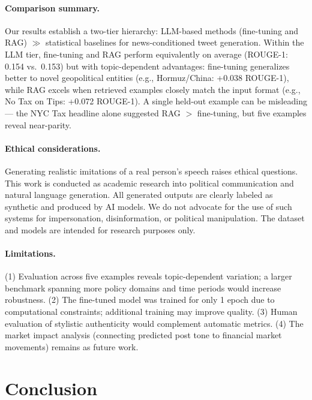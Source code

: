 \documentclass[11pt,a4paper]{article}
\begin{document}
\paragraph{Comparison summary.}
Our results establish a two-tier hierarchy: LLM-based methods (fine-tuning and RAG) $\gg$ statistical baselines for news-conditioned tweet generation. Within the LLM tier, fine-tuning and RAG perform equivalently on average (ROUGE-1: 0.154 vs.\ 0.153) but with topic-dependent advantages: fine-tuning generalizes better to novel geopolitical entities (e.g., Hormuz/China: +0.038 ROUGE-1), while RAG excels when retrieved examples closely match the input format (e.g., No Tax on Tips: +0.072 ROUGE-1). A single held-out example can be misleading — the NYC Tax headline alone suggested RAG $>$ fine-tuning, but five examples reveal near-parity.

\paragraph{Ethical considerations.}
Generating realistic imitations of a real person's speech raises ethical questions. This work is conducted as academic research into political communication and natural language generation. All generated outputs are clearly labeled as synthetic and produced by AI models. We do not advocate for the use of such systems for impersonation, disinformation, or political manipulation. The dataset and models are intended for research purposes only.

\paragraph{Limitations.}
(1) Evaluation across five examples reveals topic-dependent variation; a larger benchmark spanning more policy domains and time periods would increase robustness. (2) The fine-tuned model was trained for only 1 epoch due to computational constraints; additional training may improve quality. (3) Human evaluation of stylistic authenticity would complement automatic metrics. (4) The market impact analysis (connecting predicted post tone to financial market movements) remains as future work.

\section{Conclusion}
\end{document}
